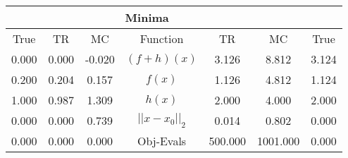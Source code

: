 \begin{tabular}{| c |c |c || c |c |c |c |}
    \hline
    \rowcolor[gray]{0.9}
\multicolumn{3}{|c|}{Parameters} & \multicolumn{4}{|c|}{Minima}\\ \hline True & TR & MC  & Function & TR & MC & True \\
    \hline
  \rowcolor[gray]{0.7}
  0.000 & 0.000 & -0.020   & $ (f + h)(x) $ & 3.126 & 8.812 & 3.124 \\
  \rowcolor[gray]{0.8}
  0.200 & 0.204 & 0.157   & $ f(x) $ & 1.126 & 4.812 & 1.124 \\
  \rowcolor[gray]{0.7}
  1.000 & 0.987 & 1.309   & $ h(x) $ & 2.000 & 4.000 & 2.000 \\
  \rowcolor[gray]{0.8}
  0.000 & 0.000 & 0.739   & $ ||x - x_0||_2 $ & 0.014 & 0.802 & 0.000 \\
  \rowcolor[gray]{0.7}
  0.000 & 0.000 & 0.000   & Obj-Evals & 500.000 & 1001.000 & 0.000 \\
\end{tabular}
